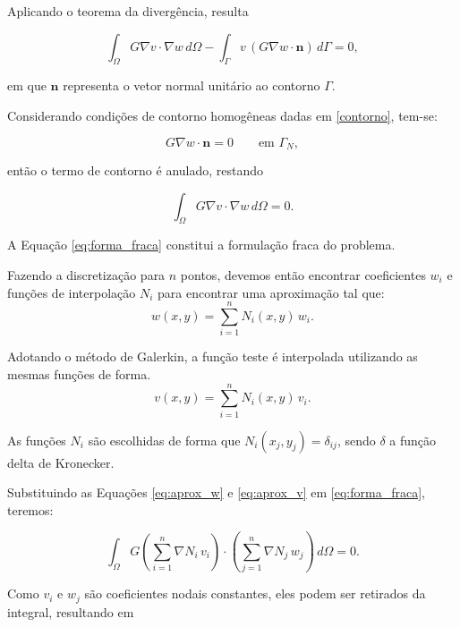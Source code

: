 \documentclass[brazil]{TCAM} %
\begin{document}
Aplicando o teorema da divergência, resulta

\begin{equation*}
\int_{\Omega} G \nabla v \cdot \nabla w \, d\Omega
-
\int_{\Gamma}
v \, (G\nabla w \cdot \mathbf{n})
\, d\Gamma
=
0,
\end{equation*}

em que $\mathbf{n}$ representa o vetor normal unitário ao contorno $\Gamma$.

Considerando condições de contorno  homogêneas dadas em \eqref{contorno}, tem-se:

\begin{equation*}
G\nabla w \cdot \mathbf{n}=0
\qquad \text{em } \Gamma_N,
\end{equation*}

então o termo de contorno é anulado, restando

\begin{equation}
\int_{\Omega}
G \nabla v \cdot \nabla w
\, d\Omega
=
0.
\label{eq:forma_fraca}
\end{equation}

A Equação \eqref{eq:forma_fraca} constitui a formulação fraca do problema.

Fazendo a discretização para $n$ pontos, devemos então encontrar coeficientes $w_i$ e funções de interpolação $N_i$ para encontrar uma aproximação tal que:
\begin{equation}
    w(x,y)
=
\sum_{i=1}^{n}
N_i(x,y)\, w_i.
\label{eq:aprox_w}
\end{equation}

 Adotando o método de Galerkin, a função teste é interpolada utilizando as mesmas funções de forma.
\begin{equation}
v(x,y)
=
\sum_{i=1}^{n}
N_i(x,y)\, v_i.
\label{eq:aprox_v}
\end{equation}

As funções $N_i$ são escolhidas de forma que $N_i(x_j,y_j)=\delta_{ij}$, sendo $\delta$ a função delta de Kronecker.

Substituindo as Equações \eqref{eq:aprox_w} e \eqref{eq:aprox_v}
em \eqref{eq:forma_fraca}, teremos:

\begin{equation*}
    \int_{\Omega}
G
\left(
\sum_{i=1}^{n}
\nabla N_i\, v_i
\right)
\cdot
\left(
\sum_{j=1}^{n}
\nabla N_j\, w_j
\right)
\, d\Omega
=0.
\end{equation*}


Como \(v_i\) e \(w_j\) são coeficientes nodais constantes, eles podem ser retirados da integral, resultando em
\end{document}
